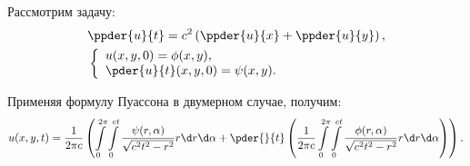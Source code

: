 Рассмотрим задачу:
\begin{align*}
    & \ppder{u}{t} = c^2\left(\ppder{u}{x} + \ppder{u}{y}\right), \\
    & \left\{ \begin{array}{l}
        u(x, y, 0) = \phi(x, y), \\
        \ds \pder{u}{t}(x, y, 0) = \psi(x, y).
    \end{array} \right.
\end{align*}

Применяя формулу Пуассона в двумерном случае, получим:
\[
    u(x, y, t) = \frac{1}{2\pi c}\left(\int\limits_0^{2\pi}\int\limits_0^{ct}
    \frac{\psi(r, \alpha)}{\sqrt{c^2t^2 - r^2}}r\d r\d\alpha + \pder{}{t}\left(
    \frac{1}{2\pi c}\int\limits_0^{2\pi}\int\limits_0^{ct}\frac{\phi(r, \alpha)}
    {\sqrt{c^2t^2 - r^2}}r\d r\d\alpha\right)\right).
\]
\newpage

